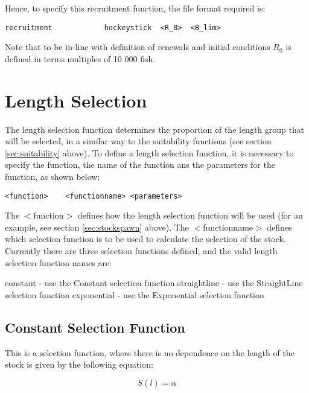 \documentclass[]{book}
\begin{document}
Hence, to specify this recruitment function, the file format required
is:

\begin{verbatim}
recruitment            hockeystick  <R_0>  <B_lim>
\end{verbatim}

Note that to be in-line with definition of renewals and initial
conditions \(R_0\) is defined in terms multiples of 10 000 fish.

\hypertarget{sec:lselection}{%
\section{Length Selection}\label{sec:lselection}}

The length selection function determines the proportion of the length
group that will be selected, in a similar way to the suitability
functions (see section \ref{sec:suitability} above). To define a length selection
function, it is necessary to specify the function, the name of the
function ans the parameters for the function, as shown below:

\begin{verbatim}
<function>    <functionname> <parameters>
\end{verbatim}

The \(<\)function\(>\) defines how the length selection function will be
used (for an example, see
section \ref{sec:stockspawn} above). The \(<\)functionname\(>\) defines which
selection function is to be used to calculate the selection of the
stock. Currently there are three selection functions defined, and the
valid length selection function names are:

constant - use the Constant selection function
straightline - use the StraightLine selection function
exponential - use the Exponential selection function

\hypertarget{constant-selection-function}{%
\subsection{Constant Selection Function}\label{constant-selection-function}}

This is a selection function, where there is no dependence on the length
of the stock is given by the following equation:

\begin{equation}
\label{eq:constsel}
S(l) = \alpha
\end{equation}
\end{document}
